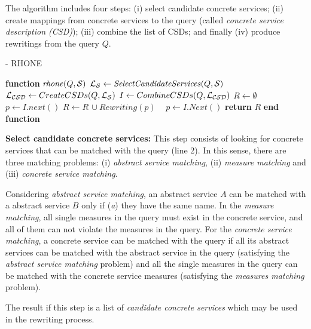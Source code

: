 The algorithm includes four steps: (i) select candidate concrete services; (ii)
create mappings from concrete services to the query (called \textit{concrete
service description (CSD)}); (iii) combine the list of CSDs; and finally (iv)
produce rewritings from the query $Q$.


\begin{algorithm}
\caption{ - RHONE}
\label{algo-rhone}

\begin{algorithmic}[1]
 
\STATE \textbf{function} $\mathit{rhone} (Q, \bigS)$
 \STATE  $\bigLS \leftarrow \mathit{SelectCandidateServices}(Q, \bigS)$ \label{rhone:buildPCD}
 \STATE  $\bigLCSD \leftarrow CreateCSDs(Q, \bigLS)$
 \STATE  $I \leftarrow CombineCSDs(Q, \bigLCSD)$
 \STATE $R\leftarrow \emptyset$
    \STATE $p \leftarrow I.next()$
  \STATE $R\leftarrow R\,\cup \mathit{Rewriting}(p)$
  \STATE ~\!
   \ENDIF
      \STATE $p \leftarrow I.\mathit{Next}()$
 \ENDWHILE
    \STATE \textbf{return} $R$
\STATE \textbf{end function}

\end{algorithmic}

\end{algorithm}


\noindent \textbf{Select candidate concrete services:} This step consists of
 looking for concrete services that can be matched with the query (line 2). In
 this sense, there are three matching problems: (i) \textit{abstract service
 matching}, (ii) \textit{measure matching} and (iii) \textit{concrete service
 matching}.
 
 Considering \textit{abstract service matching}, an abstract service $A$ can be
 matched with a abstract service $B$ only if (\textit{a}) they have the same
 name.  In the \textit{measure matching}, all single measures in the query must
 exist in the concrete service, and all of them can not violate the measures in
 the query. For the \textit{concrete service matching}, a concrete service can
 be matched with the query if all its abstract services can be matched with the
 abstract service in the query (satisfying the \textit{abstract service
 matching} problem) and all the single measures in the query can be matched with
 the concrete service measures (satisfying the \textit{measures matching} problem).


The result if this step is a list of \textit{candidate concrete services} which
 may be used in the rewriting process.

